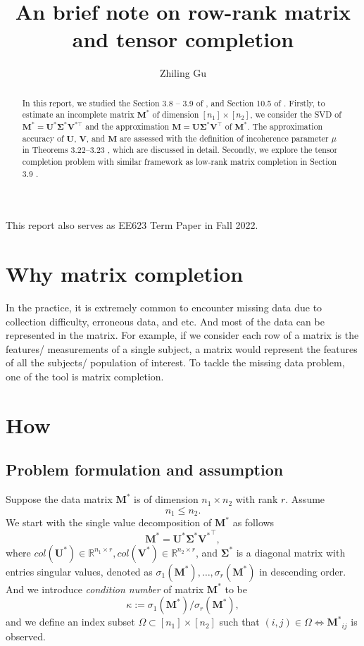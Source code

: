 \documentclass[12pt]{article}
\title{An brief note on row-rank matrix and tensor completion}
\author{Zhiling Gu}
\theoremstyle{remark}
\newcommand{\bs}[1]{{\boldsymbol{#1}^*}}
\begin{document}
\maketitle
This report also serves as EE623 Term Paper in Fall 2022.


\begin{abstract}
In this report, we studied the Section 3.8 -- 3.9 of \cite{Chen:2021}, and Section 10.5 of \cite{vershynin:2018}. 
Firstly, to estimate an incomplete matrix $\mathbf M^\ast$ of dimension $[n_1]\times [n_2]$,
we consider the SVD of $\mathbf M^\ast = \bs U \bs\Sigma \mathbf V^{\ast\top}$ and the approximation $\mathbf M = \mathbf U \bs\Sigma \mathbf V^{\top}$ of $\mathbf M^\ast$.
The approximation accuracy of $\mathbf U$, $\mathbf V$, and $\mathbf M$ are assessed with the definition of incoherence parameter $\mu$ in Theorems 3.22--3.23 \citep{Chen:2021}, which are discussed in detail.
Secondly, we explore the tensor completion problem with similar framework as low-rank matrix completion in Section 3.9 \citep{Chen:2021}.

\end{abstract}

\section{Why matrix completion}
In the practice, it is extremely common to encounter missing data due to collection difficulty, erroneous data, and etc.
And most of the data can be represented in the matrix. For example, if we consider each row of a matrix is the features/ measurements of a single subject, a matrix would represent the features of all the subjects/ population of interest.
To tackle the missing data problem, one of the tool is matrix completion. 

\section{How}
\subsection{Problem formulation and assumption}
Suppose the data matrix $\mathbf M^*$ is of dimension $n_1\times n_2$ with rank $r$.
Assume \[n_1\leq n_2.\]
We start with the single value decomposition of $\bs M$ as follows
\[
\bs M = \bs U \bs \Sigma \bs V^\top,
\]
where $col(\bs U) \in \mathbb R^{n_1\times r}, col(\bs V) \in \mathbb R^{n_2\times r}$, and $\bs \Sigma$ is a diagonal matrix with entries singular values, denoted as $\sigma_1(\bs M), \ldots, \sigma_r(\bs M)$ in descending order.
And we introduce \textit{condition number} of matrix $\bs M$ to be 
\[
\kappa := \sigma_1(\bs M)/\sigma_r(\bs M),
\]
and we define an index subset $\Omega \subset [n_1]\times [n_2]$ such that $(i,j)\in\Omega \iff \bs M_{ij}$ is observed.
\end{document}
